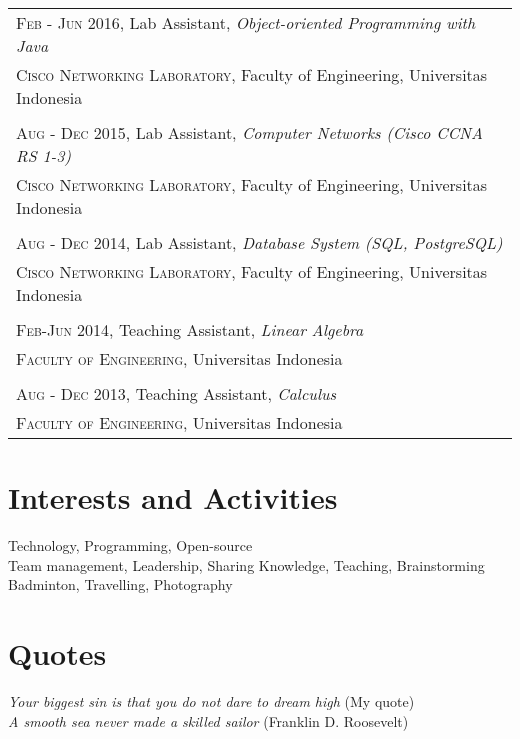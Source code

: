 \documentclass[a4paper,10pt]{article} %
\begin{document}
\begin{tabular}{l}

\textsc{Feb - Jun 2016}, Lab Assistant, \textit{Object-oriented Programming with Java}\\
\textsc{Cisco Networking Laboratory}, Faculty of Engineering, Universitas Indonesia\\ 
\\
\textsc{Aug - Dec 2015}, Lab Assistant, \textit{Computer Networks (Cisco CCNA RS 1-3)}\\
\textsc{Cisco Networking Laboratory}, Faculty of Engineering, Universitas Indonesia\\ 
\\
\textsc{Aug - Dec 2014}, Lab Assistant, \textit{Database System (SQL, PostgreSQL)}\\
\textsc{Cisco Networking Laboratory}, Faculty of Engineering, Universitas Indonesia\\ 
\\
\textsc{Feb-Jun 2014}, Teaching Assistant, \textit{Linear Algebra}\\
\textsc{Faculty of Engineering}, Universitas Indonesia\\ 
\\
\textsc{Aug - Dec 2013}, Teaching Assistant, \textit{Calculus}\\
\textsc{Faculty of Engineering}, Universitas Indonesia\\ 

\end{tabular}


\section{Interests and Activities}

Technology, Programming, Open-source\\
Team management, Leadership, Sharing Knowledge, Teaching, Brainstorming\\
Badminton, Travelling, Photography


\section{Quotes}

\textit{Your biggest sin is that you do not dare to dream high} (My quote)\\
\textit{A smooth sea never made a skilled sailor} (Franklin D. Roosevelt)

\end{document}
